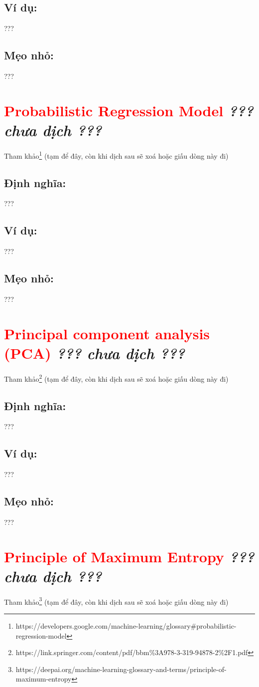 \subsection*{Ví dụ:}
???
\subsection*{Mẹo nhỏ:}
???
\section*{\huge \textcolor{Red}{Probabilistic Regression Model}  \small \textit{??? chưa dịch ???} }
Tham khảo\footnote{https://developers.google.com/machine-learning/glossary\#probabilistic-regression-model} (tạm để đây, còn khi dịch sau sẽ xoá hoặc giấu dòng này đi)
\subsection*{Định nghĩa:}
???
\subsection*{Ví dụ:}
???
\subsection*{Mẹo nhỏ:}
???
\section*{\huge \textcolor{Red}{Principal component analysis (PCA)}  \small \textit{??? chưa dịch ???} }
Tham khảo\footnote{https://link.springer.com/content/pdf/bbm\%3A978-3-319-94878-2\%2F1.pdf} (tạm để đây, còn khi dịch sau sẽ xoá hoặc giấu dòng này đi)
\subsection*{Định nghĩa:}
???
\subsection*{Ví dụ:}
???
\subsection*{Mẹo nhỏ:}
???
\section*{\huge \textcolor{Red}{Principle of Maximum Entropy}  \small \textit{??? chưa dịch ???} }
Tham khảo\footnote{https://deepai.org/machine-learning-glossary-and-terms/principle-of-maximum-entropy} (tạm để đây, còn khi dịch sau sẽ xoá hoặc giấu dòng này đi)
